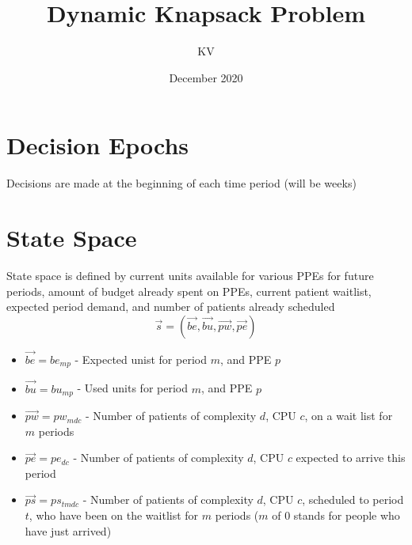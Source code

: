 \documentclass{article}
\title{Dynamic Knapsack Problem}
\author{KV}
\date{December 2020}
\begin{document}
\maketitle

\section{Decision Epochs}
Decisions are made at the beginning of each time period (will be weeks)

\section{State Space}
State space is defined by current units available for various PPEs for future periods, amount of budget already spent on PPEs, current patient waitlist, expected period demand, and number of patients already scheduled
\[ \vec{s}  = (\vec{be}, \vec{bu}, \vec{pw}, \vec{pe})\]
\begin{itemize}
    \item $\vec{be} = be_{mp}$ - Expected unist for period $m$, and PPE $p$
    \item $\vec{bu} = bu_{mp}$ - Used units for period $m$, and PPE $p$
    \item $\vec{pw} = pw_{mdc}$ - Number of patients of complexity $d$, CPU $c$, on a wait list for $m$ periods
    \item $\vec{pe} = pe_{dc}$ - Number of patients of complexity $d$, CPU $c$ expected to arrive this period
    \item $\vec{ps} = ps_{tmdc}$ - Number of patients of complexity $d$, CPU $c$, scheduled to period $t$, who have been on the waitlist for $m$ periods ($m$ of 0 stands for people who have just arrived)
\end{itemize}
\end{document}
